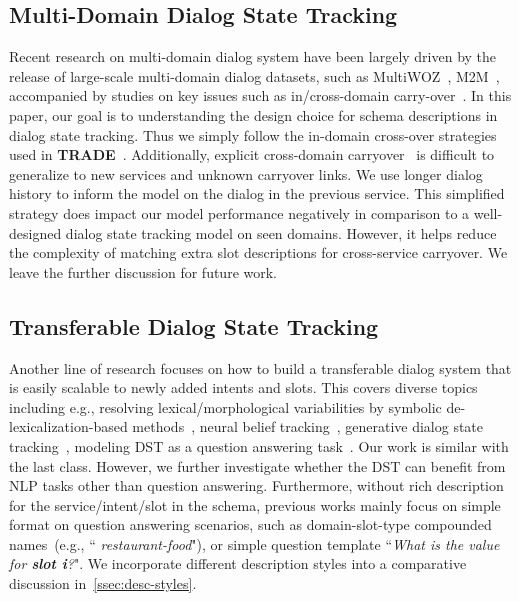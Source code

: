 \subsection{Multi-Domain Dialog State Tracking}
\label{ssec:sgd:multi-domain}
Recent research on multi-domain dialog system have been largely driven
by the release of large-scale multi-domain dialog datasets, such as
MultiWOZ~\citep{budzianowski2018multiwoz},
M2M~\citep{shah-etal-2018-bootstrapping}, accompanied by studies on key
issues such as in/cross-domain carry-over~\citep{ kim2019efficient}. In
this paper, our goal is to understanding the design choice for schema
descriptions in dialog state tracking.  Thus we simply follow the
in-domain cross-over strategies used in {\bf
  TRADE}~\citep{wu2019transferable}. Additionally, explicit
cross-domain carryover~\citep{naik2018contextual} is difficult to
generalize to new services and unknown carryover links. We use longer
dialog history to inform the model on the dialog in the previous
service. This simplified strategy does impact our model performance
negatively in comparison to a well-designed dialog state tracking
model on seen domains. However, it helps reduce the complexity of
matching extra slot descriptions for cross-service carryover. We leave
the further discussion for future work.

\subsection{Transferable Dialog State Tracking}
\label{ssec:sgd:transfer-dialogue}
Another line of research focuses on how to build a transferable dialog
system that is easily scalable to newly added intents and slots. This
covers diverse topics including e.g., resolving lexical/morphological
variabilities by symbolic de-lexicalization-based
methods~\citep{henderson2014word, williams2016dialog}, neural belief
tracking~\citep{mrkvsic2017neural}, generative dialog state
tracking~\citep{peng2020soloist, hosseini2020simple}, modeling DST as a
question answering task~\citep{zhang2019find, lee2019sumbt,
  gao2020machine, gao2019dialog}. Our work is similar with the last
class. However, we further investigate whether the DST can benefit
from NLP tasks other than question answering. Furthermore, without
rich description for the service/intent/slot in the schema, previous
works mainly focus on simple format on question answering scenarios,
such as domain-slot-type compounded names~(e.g., ``{\it
  restaurant-food}"), or simple question template ``{\it What is the
  value for {\bf slot i}?}". We incorporate different description
styles into a comparative discussion in~\autoref{ssec:desc-styles}.


